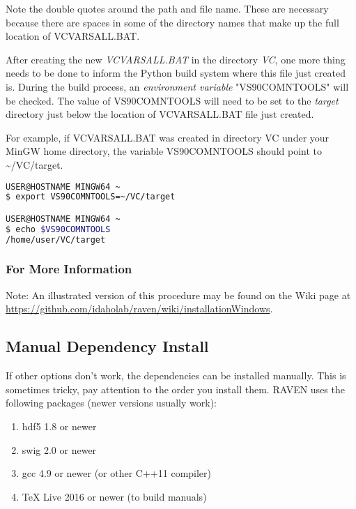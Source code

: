 \begin{enumerate}
		Note the double quotes around the path and file name. These are necessary because 
		there are spaces in some of the directory names that make up the full location of 
		VCVARSALL.BAT.

		After creating the new {\it VCVARSALL.BAT} in the directory {\it VC}, one more thing 
		needs to be done to inform the Python build system where this file just created is. 
		During the build process, an {\it environment variable} "VS90COMNTOOLS" will be checked. 
		The value of VS90COMNTOOLS will need to be set to the {\it target} directory just below 
		the location of VCVARSALL.BAT file just created. 

		For example, if VCVARSALL.BAT was created in directory VC under your MinGW home 
		directory, the variable VS90COMNTOOLS should point to \textasciitilde /VC/target.

\begin{lstlisting}[language=bash]
USER@HOSTNAME MINGW64 ~
$ export VS90COMNTOOLS=~/VC/target

USER@HOSTNAME MINGW64 ~
$ echo $VS90COMNTOOLS
/home/user/VC/target
\end{lstlisting}

\end{enumerate}

\subsubsection{For More Information}
Note: An illustrated version of this procedure may be found on the Wiki page at
\url{https://github.com/idaholab/raven/wiki/installationWindows}.

\subsection{Manual Dependency Install}
\label{sysprep_manual}

If other options don't work, the dependencies can be installed
manually.  This is sometimes tricky, pay attention to the order you
install them.  RAVEN uses the following packages (newer versions
usually work):

\begin{enumerate}
  
\item hdf5 1.8 or newer
\item swig 2.0 or newer
\item gcc 4.9 or newer (or other C++11 compiler)
\item TeX Live 2016 or newer (to build manuals)
\end{enumerate}

